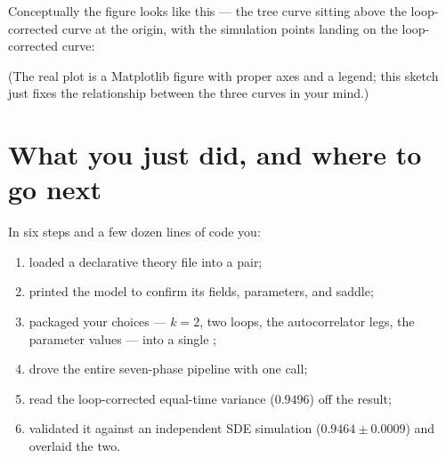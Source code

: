 Conceptually the figure looks like this --- the tree curve sitting above the
loop-corrected curve at the origin, with the simulation points landing on the
loop-corrected curve:

\begin{center}
\end{center}

(The real plot is a Matplotlib figure with proper axes and a legend; this sketch
just fixes the relationship between the three curves in your mind.)

\section{What you just did, and where to go next}

In six steps and a few dozen lines of code you:
\begin{enumerate}
  \item loaded a declarative theory file into a  pair;
  \item printed the model to confirm its fields, parameters, and saddle;
  \item packaged your choices --- $k=2$, two loops, the autocorrelator legs, the
        parameter values --- into a single ;
  \item drove the entire seven-phase \msrjd{} pipeline with one  call;
  \item read the loop-corrected equal-time variance ($0.9496$) off the result;
  \item validated it against an independent SDE simulation ($0.9464 \pm 0.0009$)
        and overlaid the two.
\end{enumerate}

